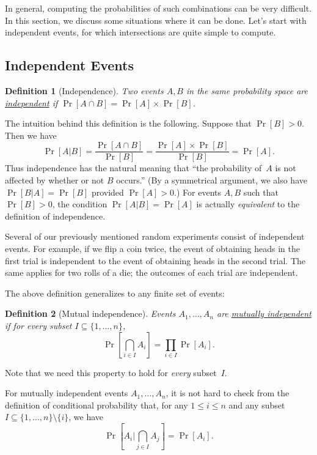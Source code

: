 \documentclass[11pt]{article}
\def\ul#1{\underline{#1}}
\newcounter{thm}
\newtheorem{definition}{Definition}[thm]
\begin{document}
In general, computing the probabilities of such combinations
can be very difficult.  In this section, we discuss some
situations where it can be done. Let's start with independent events,
for which intersections are quite simple to compute. 

\subsection*{Independent Events}

\begin{definition}[Independence]
Two events $A,B$ in the same probability space
are \ul{independent} if $\Pr[A\cap B]=\Pr[A]\times \Pr[B]$.
\end{definition}

The intuition behind this definition is the following.  Suppose that
$\Pr[B]>0$.  Then we have  $$
   \Pr[A\vert B] = \frac{\Pr[A\cap B]}{\Pr[B]} = \frac{\Pr[A]\times \Pr[B]}{\Pr[B]} = \Pr[A]. $$
Thus independence has the natural meaning that ``the probability of~$A$ is not affected by
whether or not $B$ occurs.''  (By a symmetrical argument, we also have
$\Pr[B\vert A] = \Pr[B]$ provided $\Pr[A]>0$.)  For events $A,B$ such that
$\Pr[B]>0$, the condition $\Pr[A\vert B]=\Pr[A]$ is actually {\it equivalent\/}
to the definition of independence.

Several of our previously mentioned random experiments consist of independent events.
For example, if we flip a coin twice, the event of obtaining heads in the first trial
is independent to the event of obtaining heads in the second trial. The same applies
for two rolls of a die; the outcomes of each trial are independent. 

The above definition generalizes to any finite set of events:
\begin{definition}[Mutual independence]
Events $A_1,\ldots,A_n$ are \ul{mutually independent} if for every
subset $I\subseteq\{1,\ldots,n\}$, $$
   {\textstyle\Pr[\bigcap_{i\in I}A_i] = \prod_{i\in I}\Pr[A_i]}.  $$
\end{definition}

Note that we need this property to hold for {\it every\/} subset~$I$.

For mutually independent events $A_1,\ldots,A_n$, it is not hard to check
from the definition of conditional probability that,
for any $1\le i\le n$ and any subset $I\subseteq\{1,\ldots,n\}\setminus\{i\}$,
we have $$
     {\textstyle\Pr[A_i\vert \bigcap_{j\in I}A_j] = \Pr[A_i]}.  $$
\end{document}
